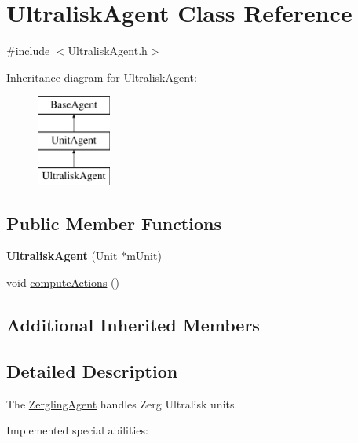 \hypertarget{class_ultralisk_agent}{\section{Ultralisk\-Agent Class Reference}
\label{class_ultralisk_agent}
}


{\ttfamily \#include $<$Ultralisk\-Agent.\-h$>$}

Inheritance diagram for Ultralisk\-Agent\-:\begin{figure}[H]
\begin{center}
\leavevmode
\includegraphics[height=3.000000cm]{class_ultralisk_agent}
\end{center}
\end{figure}
\subsection*{Public Member Functions}
\begin{DoxyCompactItemize}
\item 
\hypertarget{class_ultralisk_agent_a1ccd4a747a0310fbe078845f053a88a8}{{\bfseries Ultralisk\-Agent} (Unit $\ast$m\-Unit)}\label{class_ultralisk_agent_a1ccd4a747a0310fbe078845f053a88a8}

\item 
void \hyperlink{class_ultralisk_agent_a2591c446dfb5029a738b9b21f30b6347}{compute\-Actions} ()
\end{DoxyCompactItemize}
\subsection*{Additional Inherited Members}


\subsection{Detailed Description}
The \hyperlink{class_zergling_agent}{Zergling\-Agent} handles Zerg Ultralisk units.

Implemented special abilities\-:
\begin{DoxyItemize}
\item 
\end{DoxyItemize}

